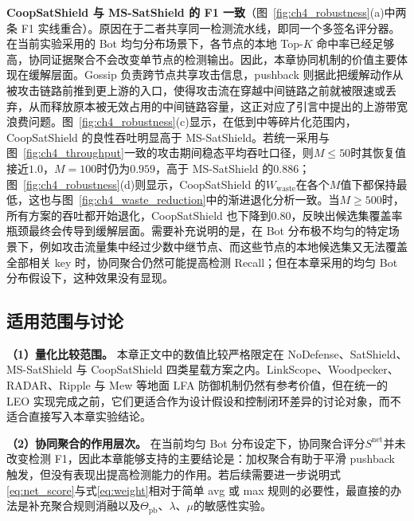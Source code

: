 \textbf{CoopSatShield 与 MS-SatShield 的 F1 一致}（图~\ref{fig:ch4_robustness}(a)中两条 F1 实线重合）。原因在于二者共享同一检测流水线，即同一个多签名评分器。在当前实验采用的 Bot 均匀分布场景下，各节点的本地 Top-$K$ 命中率已经足够高，协同证据聚合不会改变单节点的检测输出。因此，本章协同机制的价值主要体现在缓解层面。Gossip 负责跨节点共享攻击信息，pushback 则据此把缓解动作从被攻击链路前推到更上游的入口，使得攻击流在穿越中间链路之前就被限速或丢弃，从而释放原本被无效占用的中间链路容量，这正对应了引言中提出的上游带宽浪费问题。图~\ref{fig:ch4_robustness}(c)显示，在低到中等碎片化范围内，CoopSatShield 的良性吞吐明显高于 MS-SatShield。若统一采用与图~\ref{fig:ch4_throughput}一致的攻击期间稳态平均吞吐口径，则$M\leq 50$时其恢复值接近$1.0$，$M=100$时仍为$0.959$，高于 MS-SatShield 的$0.886$；图~\ref{fig:ch4_robustness}(d)则显示，CoopSatShield 的$W_{\text{waste}}$在各个$M$值下都保持最低，这也与图~\ref{fig:ch4_waste_reduction}中的渐进退化分析一致。当$M\geq500$时，所有方案的吞吐都开始退化，CoopSatShield 也下降到$0.80$，反映出候选集覆盖率瓶颈最终会传导到缓解层面。需要补充说明的是，在 Bot 分布极不均匀的特定场景下，例如攻击流量集中经过少数中继节点、而这些节点的本地候选集又无法覆盖全部相关 key 时，协同聚合仍然可能提高检测 Recall；但在本章采用的均匀 Bot 分布假设下，这种效果没有显现。




\subsection{适用范围与讨论}
\label{subsec:ch4_discussion}

\textbf{（1）量化比较范围。} 本章正文中的数值比较严格限定在 NoDefense、SatShield、MS-SatShield 与 CoopSatShield 四类星载方案之内。LinkScope、Woodpecker、RADAR、Ripple 与 Mew 等地面 LFA 防御机制仍然有参考价值，但在统一的 LEO 实现完成之前，它们更适合作为设计假设和控制闭环差异的讨论对象，而不适合直接写入本章实验结论。

\textbf{（2）协同聚合的作用层次。} 在当前均匀 Bot 分布设定下，协同聚合评分$S^{\text{net}}$并未改变检测 F1，因此本章能够支持的主要结论是：加权聚合有助于平滑 pushback 触发，但没有表现出提高检测能力的作用。若后续需要进一步说明式\eqref{eq:net_score}与式\eqref{eq:weight}相对于简单 avg 或 max 规则的必要性，最直接的办法是补充聚合规则消融以及$\Theta_{\text{pb}}、\lambda、\mu$的敏感性实验。

